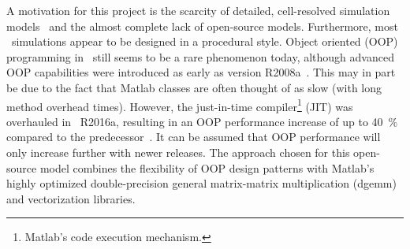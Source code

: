 A motivation for this project is the scarcity of detailed, cell-resolved simulation models~\cite{cordoba-arenas_control-oriented_2015} and the almost complete lack of open-source models. Furthermore, most \matlab\ simulations appear to be designed in a procedural style. Object oriented (OOP) programming in \matlab\ still seems to be a rare phenomenon today, although advanced OOP capabilities were introduced as early as version R2008a~\cite{foti_inside_2008}. This may in part be due to the fact that Matlab classes are often thought of as slow (with long method overhead times). However, the just-in-time compiler\footnote{Matlab's code execution mechanism.} (JIT) was overhauled in \matlab\ R2016a, resulting in an OOP performance increase of up to 40~\% compared to the predecessor~\cite{_matlab_2016}. It can be assumed that OOP performance will only increase further with newer releases. The approach chosen for this open-source model combines the flexibility of OOP design patterns with Matlab's highly optimized double-precision general matrix-matrix multiplication (dgemm) and vectorization libraries.